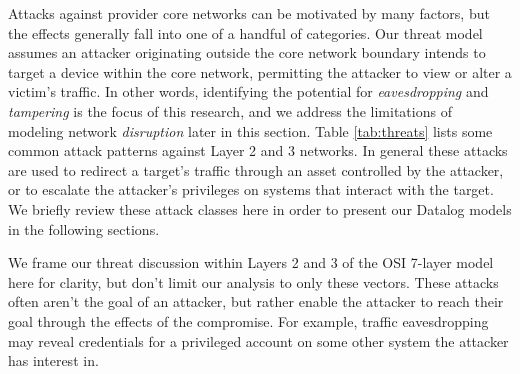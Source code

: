 


Attacks against provider core networks can be motivated by many factors, but the effects generally fall into one of a handful of categories\cite{Chakrabarti_Govindarasu_2002}. Our threat model assumes an attacker originating outside the core network boundary intends to target a device within the core network, permitting the attacker to view or alter a victim's traffic. In other words, identifying the potential for \textit{eavesdropping} and \textit{tampering} is the focus of this research, and we address the limitations of modeling network \textit{disruption} later in this section. Table \ref{tab:threats} lists some common attack patterns against Layer 2 and 3 networks. In general these attacks are used to redirect a target's traffic through an asset controlled by the attacker, or to escalate the attacker's privileges on systems that interact with the target. We briefly review these attack classes here in order to present our Datalog models in the following sections.



\begin{table}[ht]
\centering
\captionsetup{justification=centering}
\caption{Potential Threats}
\label{tab:threats}
\end{table}

We frame our threat discussion within Layers 2 and 3 of the OSI 7-layer model here for clarity, but don't limit our analysis to only these vectors. These attacks often aren't the goal of an attacker, but rather enable the attacker to reach their goal through the effects of the compromise. For example, traffic eavesdropping may reveal credentials for a privileged account on some other system the attacker has interest in. 
